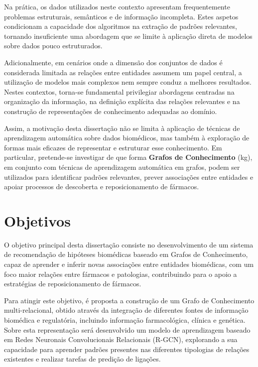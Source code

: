 Na prática, os dados utilizados neste contexto apresentam frequentemente problemas estruturais, semânticos e de informação incompleta. Estes aspetos condicionam a capacidade dos algoritmos na extração de padrões relevantes, tornando insuficiente uma abordagem que se limite à aplicação direta de modelos sobre dados pouco estruturados.

Adicionalmente, em cenários onde a dimensão dos conjuntos de dados é considerada limitada as relações entre entidades assumem um papel central, a utilização de modelos mais complexos nem sempre conduz a melhores resultados. Nestes contextos, torna-se fundamental privilegiar abordagens centradas na organização da informação, na definição explícita das relações relevantes e na construção de representações de conhecimento adequadas ao domínio.

Assim, a motivação desta dissertação não se limita à aplicação de técnicas de aprendizagem automática sobre dados biomédicos, mas também à exploração de formas mais eficazes de representar e estruturar esse conhecimento. Em particular, pretende-se investigar de que forma \textbf{Grafos de Conhecimento} (\acrfull{kg}), em conjunto com técnicas de aprendizagem automática em grafos, podem ser utilizados para identificar padrões relevantes, prever associações entre entidades e apoiar processos de descoberta e reposicionamento de fármacos.

\section{Objetivos}
\label{sec:objetivos}
O objetivo principal desta dissertação consiste no desenvolvimento de um sistema de recomendação de hipóteses biomédicas baseado em Grafos de Conhecimento, capaz de aprender e inferir novas associações entre entidades biomédicas, com um foco maior relações entre fármacos e patologias, contribuindo para o apoio a estratégias de reposicionamento de fármacos.

Para atingir este objetivo, é proposta a construção de um Grafo de Conhecimento multi-relacional, obtido através da integração de diferentes fontes de informação biomédica e regulatória, incluindo informação farmacológica, clínica e genética. Sobre esta representação será desenvolvido um modelo de aprendizagem baseado em Redes Neuronais Convolucionais Relacionais (R-GCN), explorando a sua capacidade para aprender padrões presentes nas diferentes tipologias de relações existentes e realizar tarefas de predição de ligações.

